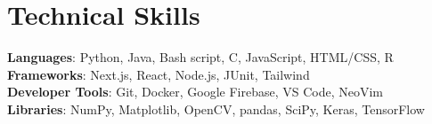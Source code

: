 \documentclass[letterpaper,11pt]{article}
\begin{document}
%
\section{Technical Skills}
 \begin{itemize}[leftmargin=0.15in, label={}]
    \small{\item{
     \textbf{Languages}{: Python, Java, Bash script, C, JavaScript, HTML/CSS, R} \\
     \textbf{Frameworks}{: Next.js, React, Node.js, JUnit, Tailwind} \\
     \textbf{Developer Tools}{: Git, Docker, Google Firebase, VS Code, NeoVim} \\
     \textbf{Libraries}{: NumPy, Matplotlib, OpenCV, pandas, SciPy, Keras, TensorFlow}
    }}
 \end{itemize}


\end{document}
